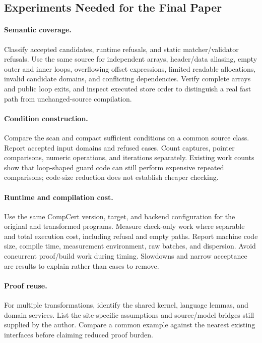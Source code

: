 \subsection{Experiments Needed for the Final Paper}

\paragraph{Semantic coverage.}
Classify accepted candidates, runtime refusals, and static matcher/validator
refusals. Use the same source for independent arrays, header/data aliasing,
empty outer and inner loops, overflowing offset expressions, limited readable
allocations, invalid candidate domains, and conflicting dependencies. Verify
complete arrays and public loop exits, and inspect executed store order to
distinguish a real fast path from unchanged-source compilation.

\paragraph{Condition construction.}
Compare the scan and compact sufficient conditions on a common source class.
Report accepted input domains and refused cases. Count captures, pointer
comparisons, numeric operations, and iterations separately. Existing work
counts show that loop-shaped guard code can still perform expensive repeated
comparisons; code-size reduction does not establish cheaper checking.

\paragraph{Runtime and compilation cost.}
Use the same CompCert version, target, and backend configuration for the original
and transformed programs. Measure check-only work where separable and total
execution cost, including refusal and empty paths. Report machine code size,
compile time, measurement environment, raw batches, and dispersion. Avoid
concurrent proof/build work during timing. Slowdowns and narrow acceptance are
results to explain rather than cases to remove.

\paragraph{Proof reuse.}
For multiple transformations, identify the shared kernel, language lemmas, and
domain services. List the site-specific assumptions and source/model bridges
still supplied by the author. Compare a common example against the nearest
existing interfaces before claiming reduced proof burden.

